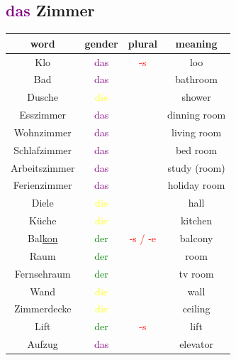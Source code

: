 \subsection{\textcolor{purple}{das} Zimmer}
\begin{center}
    \begin{tabular}{|c|c|c|c|}
        \hline
        \rowcolor{gray}
        word               & gender                  & plural                   & meaning      \\
        \hline
        Klo                & \textcolor{purple}{das} & \textcolor{red}{-s}      & loo          \\
        Bad                & \textcolor{purple}{das} &                          & bathroom     \\
        Dusche             & \textcolor{yellow}{die} &                          & shower       \\
        \hline
        Esszimmer          & \textcolor{purple}{das} &                          & dinning room \\
        Wohnzimmer         & \textcolor{purple}{das} &                          & living room  \\
        Schlafzimmer       & \textcolor{purple}{das} &                          & bed room     \\
        Arbeitszimmer      & \textcolor{purple}{das} &                          & study (room) \\
        Ferienzimmer       & \textcolor{purple}{das} &                          & holiday room \\
        \hline
        Diele              & \textcolor{yellow}{die} &                          & hall         \\
        Küche              & \textcolor{yellow}{die} &                          & kitchen      \\
        Bal\underline{kon} & \textcolor{green}{der}  & \textcolor{red}{-s / -e} & balcony      \\
        Raum               & \textcolor{green}{der}  &                          & room         \\
        Fernsehraum        & \textcolor{green}{der}  &                          & tv room      \\
        \hline
        Wand               & \textcolor{yellow}{die} &                          & wall         \\
        Zimmerdecke        & \textcolor{yellow}{die} &                          & ceiling      \\
        \hline
        Lift               & \textcolor{green}{der}  & \textcolor{red}{-s}      & lift         \\
        Aufzug             & \textcolor{purple}{das} &                          & elevator     \\
        \hline
    \end{tabular}
\end{center}

